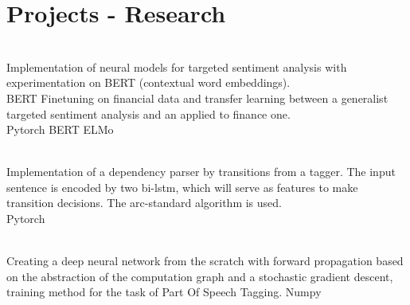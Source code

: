 \section{Projects - Research}

\\
Implementation of neural models for targeted sentiment analysis with experimentation on BERT (contextual word embeddings). \\
BERT Finetuning on financial data and transfer learning between a generalist targeted sentiment analysis and an applied to finance one. \\
\textbullet{} Pytorch \textbullet{} BERT \textbullet{} ELMo
\sectionsep

\\
Implementation of a dependency parser by transitions from a tagger. The input sentence is encoded by two bi-lstm, which will serve as features to make transition decisions. The arc-standard algorithm is used. \\
\textbullet{} Pytorch  
\sectionsep

\\
Creating a deep neural network from the scratch with forward propagation based on the abstraction of the computation graph and a stochastic gradient descent, training method for the task of Part Of Speech Tagging. 
\textbullet{} Numpy
\sectionsep
